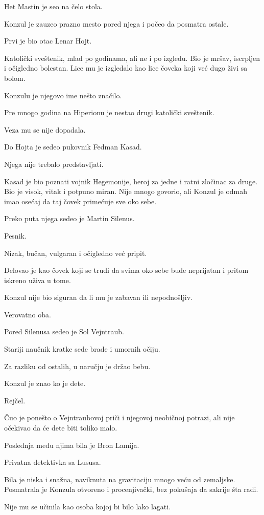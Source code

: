 Het Mastin je seo na čelo stola.

Konzul je zauzeo prazno mesto pored njega i počeo da posmatra ostale.

Prvi je bio otac Lenar Hojt.

Katolički sveštenik, mlad po godinama, ali ne i po izgledu. Bio je mršav, iscrpljen i očigledno bolestan. Lice mu je izgledalo kao lice čoveka koji već dugo živi sa bolom.

Konzulu je njegovo ime nešto značilo.

Pre mnogo godina na Hiperionu je nestao drugi katolički sveštenik.

Veza mu se nije dopadala.

Do Hojta je sedeo pukovnik Fedman Kasad.

Njega nije trebalo predstavljati.

Kasad je bio poznati vojnik Hegemonije, heroj za jedne i ratni zločinac za druge. Bio je visok, vitak i potpuno miran. Nije mnogo govorio, ali Konzul je odmah imao osećaj da taj čovek primećuje sve oko sebe.

Preko puta njega sedeo je Martin Silenus.

Pesnik.

Nizak, bučan, vulgaran i očigledno već pripit.

Delovao je kao čovek koji se trudi da svima oko sebe bude neprijatan i pritom iskreno uživa u tome.

Konzul nije bio siguran da li mu je zabavan ili nepodnošljiv.

Verovatno oba.

Pored Silenusa sedeo je Sol Vejntraub.

Stariji naučnik kratke sede brade i umornih očiju.

Za razliku od ostalih, u naručju je držao bebu.

Konzul je znao ko je dete.

Rejčel.

Čuo je ponešto o Vejntraubovoj priči i njegovoj neobičnoj potrazi, ali nije očekivao da će dete biti toliko malo.

Poslednja među njima bila je Bron Lamija.

Privatna detektivka sa Lususa.

Bila je niska i snažna, naviknuta na gravitaciju mnogo veću od zemaljske. Posmatrala je Konzula otvoreno i procenjivački, bez pokušaja da sakrije šta radi.

Nije mu se učinila kao osoba kojoj bi bilo lako lagati.

